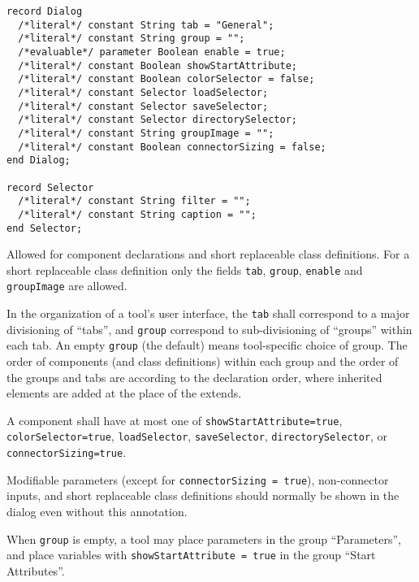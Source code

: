 \begin{annotationdefinition}[Dialog]
\begin{synopsis}\begin{lstlisting}
record Dialog
  /*literal*/ constant String tab = "General";
  /*literal*/ constant String group = "";
  /*evaluable*/ parameter Boolean enable = true;
  /*literal*/ constant Boolean showStartAttribute;
  /*literal*/ constant Boolean colorSelector = false;
  /*literal*/ constant Selector loadSelector;
  /*literal*/ constant Selector saveSelector;
  /*literal*/ constant Selector directorySelector;
  /*literal*/ constant String groupImage = "";
  /*literal*/ constant Boolean connectorSizing = false;
end Dialog;

record Selector
  /*literal*/ constant String filter = "";
  /*literal*/ constant String caption = "";
end Selector;
\end{lstlisting}\end{synopsis}
\begin{semantics}
Allowed for component declarations and short replaceable class definitions.
For a short replaceable class definition only the fields \lstinline!tab!, \lstinline!group!, \lstinline!enable! and \lstinline!groupImage! are allowed.

In the organization of a tool's user interface, the \lstinline!tab! shall correspond to a major divisioning of ``tabs'', and \lstinline!group! correspond to sub-divisioning of ``groups'' within each tab.
An empty \lstinline!group! (the default) means tool-specific choice of group.
The order of components (and class definitions) within each group and the order of the groups and tabs are according to the declaration order, where inherited elements are added at the place of the extends.

A component shall have at most one of \lstinline!showStartAttribute=true!, \lstinline!colorSelector=true!, \lstinline!loadSelector!, \lstinline!saveSelector!, \lstinline!directorySelector!, or \lstinline!connectorSizing=true!.

Modifiable parameters (except for \lstinline!connectorSizing = true!), non-connector inputs, and short replaceable class definitions should normally be shown in the dialog even without this annotation.

\begin{example}
When \lstinline!group! is empty, a tool may place parameters in the group ``Parameters'', and place variables with \lstinline!showStartAttribute = true! in the group ``Start Attributes''.
\end{example}


\end{semantics}
\end{annotationdefinition}
